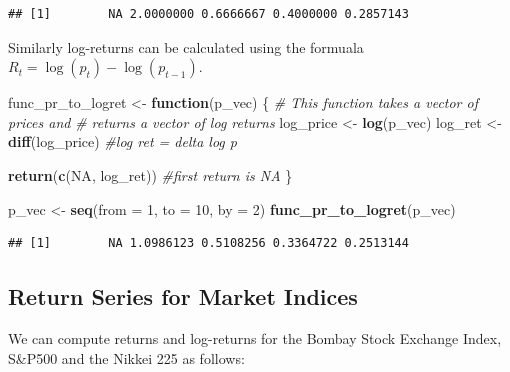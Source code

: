 \documentclass[11pt,]{article}
\newenvironment{Shaded}{\begin{snugshade}}{\end{snugshade}}
\newcommand{\KeywordTok}[1]{\textcolor[rgb]{0.13,0.29,0.53}{\textbf{#1}}}
\newcommand{\DataTypeTok}[1]{\textcolor[rgb]{0.13,0.29,0.53}{#1}}
\newcommand{\DecValTok}[1]{\textcolor[rgb]{0.00,0.00,0.81}{#1}}
\newcommand{\FloatTok}[1]{\textcolor[rgb]{0.00,0.00,0.81}{#1}}
\newcommand{\StringTok}[1]{\textcolor[rgb]{0.31,0.60,0.02}{#1}}
\newcommand{\CommentTok}[1]{\textcolor[rgb]{0.56,0.35,0.01}{\textit{#1}}}
\newcommand{\OtherTok}[1]{\textcolor[rgb]{0.56,0.35,0.01}{#1}}
\newcommand{\ControlFlowTok}[1]{\textcolor[rgb]{0.13,0.29,0.53}{\textbf{#1}}}
\newcommand{\OperatorTok}[1]{\textcolor[rgb]{0.81,0.36,0.00}{\textbf{#1}}}
\newcommand{\NormalTok}[1]{#1}
\begin{document}
\begin{verbatim}
## [1]        NA 2.0000000 0.6666667 0.4000000 0.2857143
\end{verbatim}

Similarly log-returns can be calculated using the formuala
\(R_t = \log(p_t)-\log(p_{t-1})\).

\begin{Shaded}
\begin{Highlighting}[]
\NormalTok{func_pr_to_logret <-}\StringTok{ }\ControlFlowTok{function}\NormalTok{(p_vec)}
\NormalTok{\{}
  \CommentTok{# This function takes a vector of prices and }
  \CommentTok{# returns a vector of log returns}
\NormalTok{  log_price <-}\StringTok{ }\KeywordTok{log}\NormalTok{(p_vec)}
\NormalTok{  log_ret <-}\StringTok{ }\KeywordTok{diff}\NormalTok{(log_price) }\CommentTok{#log ret = delta log p}
  
  \KeywordTok{return}\NormalTok{(}\KeywordTok{c}\NormalTok{(}\OtherTok{NA}\NormalTok{, log_ret)) }\CommentTok{#first return is NA}
\NormalTok{\}}

\NormalTok{p_vec <-}\StringTok{ }\KeywordTok{seq}\NormalTok{(}\DataTypeTok{from =} \DecValTok{1}\NormalTok{, }\DataTypeTok{to =} \DecValTok{10}\NormalTok{, }\DataTypeTok{by =} \DecValTok{2}\NormalTok{)}
\KeywordTok{func_pr_to_logret}\NormalTok{(p_vec)}
\end{Highlighting}
\end{Shaded}

\begin{verbatim}
## [1]        NA 1.0986123 0.5108256 0.3364722 0.2513144
\end{verbatim}

\subsection{Return Series for Market
Indices}\label{return-series-for-market-indices}

We can compute returns and log-returns for the Bombay Stock Exchange
Index, S\&P500 and the Nikkei 225 as follows:

\begin{Shaded}
\end{Shaded}
\end{document}
